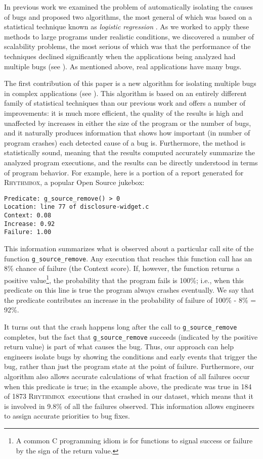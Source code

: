 \documentclass{sig-alternate}
\newcommand{\rhythmbox}{\textsc{Rhythmbox}\xspace}
\begin{document}
In previous work we examined the problem of automatically isolating
the causes of bugs and proposed two algorithms, the most general of
which was based on a statistical technique known as {\em logistic
regression} \cite{PLDI`03*141,Zheng:2003:SDSP}.  As we worked to apply
these methods to large programs under realistic conditions, we
discovered a number of scalability problems, the most serious of which
was that the performance of the techniques declined significantly 
when the applications being analyzed had multiple bugs (see
).  As mentioned above, real applications
have many bugs.

The first contribution of this paper is a new algorithm for isolating
multiple bugs in complex applications (see ).  This algorithm 
is based on an entirely different family of statistical techniques than our previous work and offers
a number of improvements:
it is much more efficient, the quality of the
results is high and unaffected by increases in either the size of the program
or the number of bugs, and it naturally produces information
that shows how important (in number of program crashes) each detected
cause of a bug is.  Furthermore, the method is statistically sound, meaning that
the results computed accurately summarize the analyzed program 
executions, and the results can be directly understood in terms of program behavior.
For example, here is a portion of a report generated for \rhythmbox,
a popular Open Source jukebox:
\begin{verbatim}
Predicate: g_source_remove() > 0 
Location: line 77 of disclosure-widget.c
Context: 0.08
Increase: 0.92   
Failure: 1.00   
\end{verbatim}
This information summarizes what is observed about a particular call site of the function {\tt g\_source\_remove}.
Any execution that reaches this function call has an 8\% chance of failure (the Context score).  If, however,
the function returns a
positive value\footnote{A common C programming idiom is for functions to signal success or failure by the sign of the return value.}, the probability that the program fails is 100\%; i.e., when this predicate on this line is true the program always crashes eventually.  We say that the predicate contributes an increase in the probability of failure of 100\% - 8\% = 92\%.

It turns out that the crash happens long after the call to {\tt g\_source\_remove} completes,
but the fact that {\tt g\_source\_remove} succeeds (indicated by the positive return value) is part of what causes the bug.  Thus,
our approach can help engineers isolate bugs by showing the conditions and early events that trigger the bug, rather than just the
program state at the point of failure.  Furthermore, our algorithm also allows accurate calculations of what fraction of all failures occur when this predicate
is true; in the example above, the predicate was true in 184 of 1873 \rhythmbox\ executions that crashed in our dataset, which means that
it is involved in 9.8\% of all the failures observed.  This information allows engineers to assign accurate priorities to bug fixes.
\end{document}
